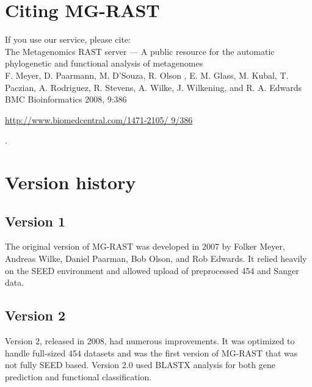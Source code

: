 \documentclass[12pt,fullpage]{report}
\begin{document}
\section{Citing MG-RAST}
\label{section:MG-RAST-citation}
If you use our service, please cite: \\
\noindent
The Metagenomics RAST server --- A public resource for the automatic phylogenetic and functional analysis of metagenomes \\
\noindent
F. Meyer, D. Paarmann, M. D'Souza, R. Olson , E. M. Glass, M. Kubal, T. Paczian, A. Rodriguez, R. Stevens, A. Wilke, J. Wilkening, and R. A. Edwards \\
\noindent
BMC Bioinformatics 2008, 9:386 \\
\noindent
\begin{small}\url{http://www.biomedcentral.com/1471-2105/ 9/386}\end{small}.
\section{Version history}
\subsection*{Version 1}
The original version of MG-RAST was developed in 2007 by Folker Meyer, Andreas Wilke, Daniel Paarman, Bob Olson, and Rob Edwards. It relied heavily on the \gls{SEED}\cite{SUBSYSTEMS} environment and allowed upload of preprocessed 454 and Sanger data.
\subsection*{Version 2}
Version 2, released in 2008, had numerous improvements. It was optimized to handle full-sized 454 datasets and was the first version of MG-RAST that was not fully \gls{SEED} based.
Version 2.0 used BLASTX analysis for both gene prediction and functional classification\cite{MG-RAST}.
\end{document}
